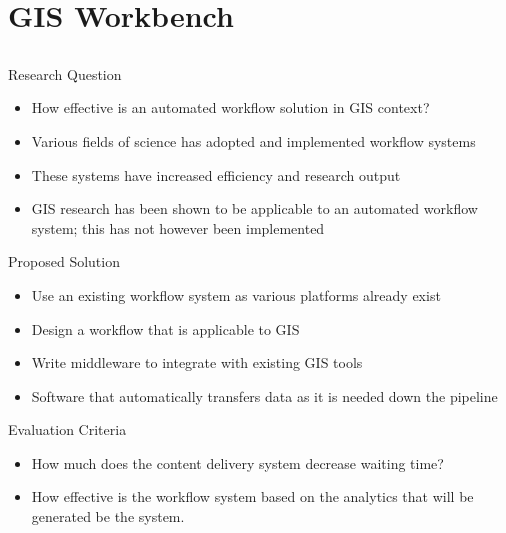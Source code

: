 \documentclass{beamer}
\begin{document}
\section{GIS Workbench}
\subsection{}
\begin{frame}{Research Question}

\begin{itemize}
\item How effective is an automated workflow solution in GIS context?
\end{itemize}
\end{frame}



\begin{frame}{}
\begin{itemize}
\item Various fields of science has adopted and implemented
  workflow systems
\item These systems have increased efficiency and research output
\item GIS research has been shown to be applicable to an automated
  workflow system; this has not however been implemented
\end{itemize}
\end{frame}


\begin{frame}{Proposed Solution}

\begin{itemize}
\item Use an existing workflow system as various platforms already
  exist
\item Design a workflow that is applicable to GIS
\item Write middleware to integrate with existing GIS tools
\item Software that automatically transfers data as it is needed down
  the pipeline
\end{itemize}
\end{frame}


\begin{frame}{Evaluation Criteria}
\begin{itemize}
\item How much does the content delivery system decrease waiting time?
\item How effective is the workflow system based on the analytics that
  will be generated be the system.
\end{itemize}
\end{frame}
\end{document}
